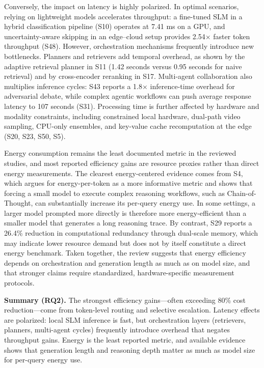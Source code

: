 Conversely, the impact on latency is highly polarized. In optimal scenarios, relying on lightweight models accelerates throughput: a fine-tuned SLM in a hybrid classification pipeline (S10) operates at 7.41 ms on a GPU, and uncertainty-aware skipping in an edge--cloud setup provides 2.54$\times$ faster token throughput (S48). However, orchestration mechanisms frequently introduce new bottlenecks. Planners and retrievers add temporal overhead, as shown by the adaptive retrieval planner in S11 (1.42 seconds versus 0.95 seconds for naive retrieval) and by cross-encoder reranking in S17. Multi-agent collaboration also multiplies inference cycles: S43 reports a 1.8$\times$ inference-time overhead for adversarial debate, while complex agentic workflows can push average response latency to 107 seconds (S31). Processing time is further affected by hardware and modality constraints, including constrained local hardware, dual-path video sampling, CPU-only ensembles, and key-value cache recomputation at the edge (S20, S23, S50, S5).

Energy consumption remains the least documented metric in the reviewed studies, and most reported efficiency gains are resource proxies rather than direct energy measurements. The clearest energy-centered evidence comes from S4, which argues for energy-per-token as a more informative metric and shows that forcing a small model to execute complex reasoning workflows, such as Chain-of-Thought, can substantially increase its per-query energy use. In some settings, a larger model prompted more directly is therefore more energy-efficient than a smaller model that generates a long reasoning trace. By contrast, S29 reports a 26.4\% reduction in computational redundancy through dual-scale memory, which may indicate lower resource demand but does not by itself constitute a direct energy benchmark. Taken together, the review suggests that energy efficiency depends on orchestration and generation length as much as on model size, and that stronger claims require standardized, hardware-specific measurement protocols.

\noindent\textbf{Summary (RQ2).} The strongest efficiency gains---often exceeding 80\% cost reduction---come from token-level routing and selective escalation. Latency effects are polarized: local SLM inference is fast, but orchestration layers (retrievers, planners, multi-agent cycles) frequently introduce overhead that negates throughput gains. Energy is the least reported metric, and available evidence shows that generation length and reasoning depth matter as much as model size for per-query energy use.

